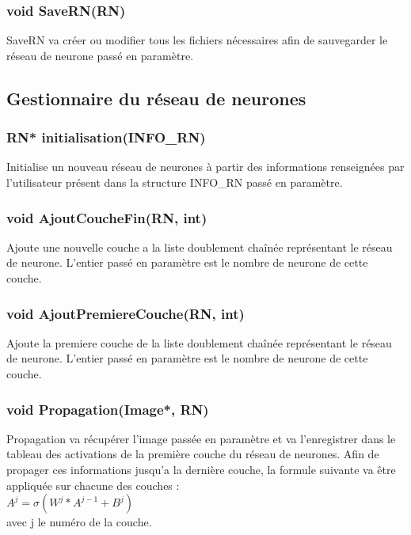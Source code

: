\documentclass{article}
\begin{document}
		\subsubsection{\textcolor{myblue}{\textbf{void}} SaveRN(\textcolor{myblue}{\textbf{RN}})}
		SaveRN va créer ou modifier tous les fichiers nécessaires afin de sauvegarder le réseau de neurone passé en paramètre.
		
	
	\subsection{Gestionnaire du réseau de neurones}
		\subsubsection{\textcolor{myblue}{\textbf{RN*}} initialisation(\textcolor{myblue}{\textbf{INFO\_RN}})}
		Initialise un nouveau réseau de neurones à partir des informations renseignées par l'utilisateur présent dans la structure INFO\_RN passé en paramètre.
		
		\subsubsection{\textcolor{myblue}{\textbf{void}} AjoutCoucheFin(\textcolor{myblue}{\textbf{RN}}, \textcolor{myblue}{\textbf{int}})}
		Ajoute une nouvelle couche a la liste doublement chaînée représentant le réseau de neurone. L'entier passé en paramètre est le nombre de neurone de cette couche.
		
		\subsubsection{\textcolor{myblue}{\textbf{void}} AjoutPremiereCouche(\textcolor{myblue}{\textbf{RN}}, \textcolor{myblue}{\textbf{int}})}
		Ajoute la premiere couche de la liste doublement chaînée représentant le réseau de neurone. L'entier passé en paramètre est le nombre de neurone de cette couche.
		
		\subsubsection{\textcolor{myblue}{\textbf{void}} Propagation(\textcolor{myblue}{\textbf{Image*}}, \textcolor{myblue}{\textbf{RN}})}
		Propagation va récupérer l'image passée en paramètre et va l'enregistrer dans le tableau des activations de la première couche du réseau de neurones. Afin de propager ces informations jusqu'a la dernière couche, la formule suivante va être appliquée sur chacune des couches :\\ $A^j = \sigma(W^j*A^{j-1}+B^j)$\\
		avec j le numéro de la couche.
		
\end{document}
